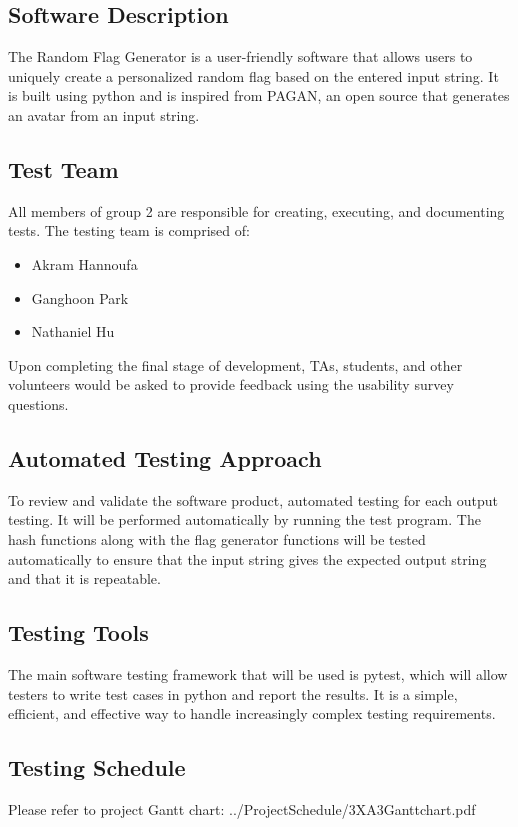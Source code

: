 \documentclass[12pt, titlepage]{article}
\begin{document}
\subsection{Software Description}
The Random Flag Generator is a user-friendly software that allows users to uniquely create a personalized random flag based on the entered input string. It is built using python and is inspired from PAGAN, an open source that generates an avatar from an input string. 

\subsection{Test Team}
All members of group 2 are responsible for creating, executing, and documenting tests. The testing team is comprised of:
\begin{itemize}
    \item Akram Hannoufa
    \item Ganghoon Park
    \item Nathaniel Hu
  \end{itemize}  
Upon completing the final stage of development, TAs, students, and other volunteers would be asked to provide feedback using the usability survey questions.

\subsection{Automated Testing Approach}
To review and validate the software product, automated testing for each output testing. It will be performed automatically by running the test program. The hash functions along with the flag generator functions will be tested automatically to ensure that the input string gives the expected output string and that it is repeatable.

\subsection{Testing Tools}
The main software testing framework that will be used is pytest, which will allow testers to write test cases in python and report the results. It is a simple, efficient, and effective way to handle increasingly complex testing requirements. 

\subsection{Testing Schedule}
Please refer to project Gantt chart: ../ProjectSchedule/3XA3Ganttchart.pdf
\end{document}
